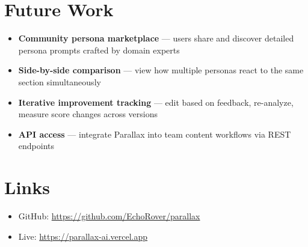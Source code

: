 \documentclass[a4paper, 11pt, twocolumn]{article}
\begin{document}
\section{Future Work}

\begin{itemize}[nosep, leftmargin=1.2em]
    \item \textbf{Community persona marketplace} --- users share and discover detailed persona prompts crafted by domain experts
    \item \textbf{Side-by-side comparison} --- view how multiple personas react to the same section simultaneously
    \item \textbf{Iterative improvement tracking} --- edit based on feedback, re-analyze, measure score changes across versions
    \item \textbf{API access} --- integrate Parallax into team content workflows via REST endpoints
\end{itemize}

\section*{Links}

\begin{itemize}[nosep, leftmargin=1.2em]
    \item GitHub: \url{https://github.com/EchoRover/parallax}
    \item Live: \url{https://parallax-ai.vercel.app}
\end{itemize}
\end{document}
